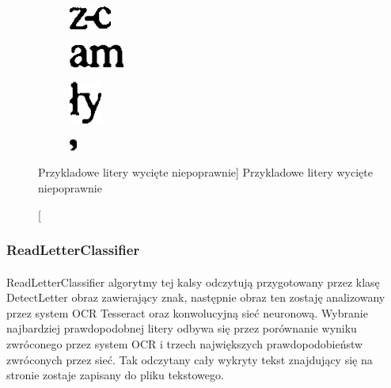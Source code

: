 \documentclass[a4paper,12pt]{article}
\begin{document}
            \begin{figure}[h!]
                \centering
                \begin{subfigure}[b]{2cm}
                    \includegraphics[frame]{image//practicalPart//w_letter_01.png}
                \caption{}
                \end{subfigure}
                \begin{subfigure}[b]{2cm}
                    \includegraphics[frame]{image//practicalPart//w_letter_02.png}
                \caption{}
                \end{subfigure}
              \newline
                \begin{subfigure}[b]{2cm}
                    \includegraphics[frame]{image//practicalPart//w_letter_03.png}
                \caption{}
                \end{subfigure}
                \begin{subfigure}[b]{2cm}
                    \includegraphics[frame]{image//practicalPart//w_letter_04.png}
                    \caption{}
                \end{subfigure}
                \caption
                    [Przykladowe litery wycięte niepoprawnie]
                    {Przykladowe litery wycięte niepoprawnie}
            \end{figure}

        \subsubsection{ReadLetterClassifier}
	        \paragraph{} ReadLetterClassifier algorytmy tej kalsy odczytują przygotowany     przez klasę DetectLetter obraz zawierający znak, następnie obraz ten        zostaję analizowany przez system OCR Tesseract oraz konwolucyjną sieć       neuronową. Wybranie najbardziej prawdopodobnej litery odbywa się przez      porównanie wyniku zwróconego przez system OCR i trzech największych         prawdopodobieństw zwróconych przez sieć. Tak odczytany cały wykryty         tekst znajdujący się na stronie zostaje zapisany do pliku tekstowego.
	        
\end{document}

